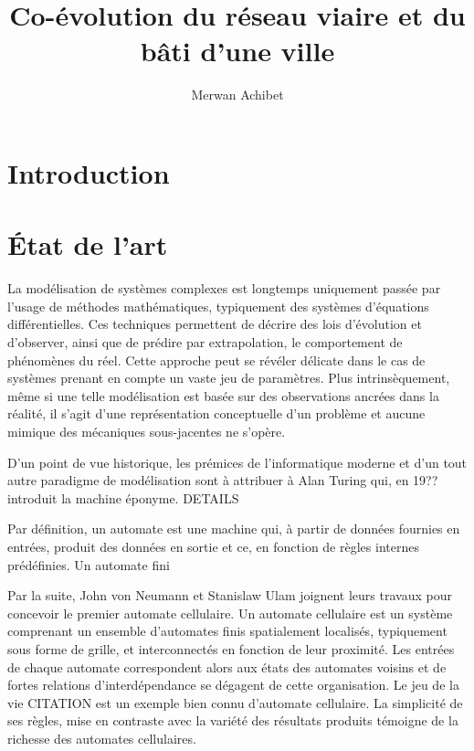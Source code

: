 \documentclass[10pt,twocolumn]{article}
\title{Co-évolution du réseau viaire et du bâti d'une ville}
\author{Merwan Achibet}
\date{}
\begin{document}
\maketitle

\begin{abstract}

\end{abstract}

\section{Introduction}

\section{\'Etat de l'art}

La modélisation de systèmes complexes est longtemps uniquement passée
par l'usage de méthodes mathématiques, typiquement des systèmes
d'équations différentielles. Ces techniques permettent de décrire des
lois d'évolution et d'observer, ainsi que de prédire par
extrapolation, le comportement de phénomènes du réel. Cette approche
peut se révéler délicate dans le cas de systèmes prenant en compte un
vaste jeu de paramètres. Plus intrinsèquement, même si une telle
modélisation est basée sur des observations ancrées dans la réalité,
il s'agit d'une représentation conceptuelle d'un problème et aucune
mimique des mécaniques sous-jacentes ne s'opère.

D'un point de vue historique, les prémices de l'informatique moderne
et d'un tout autre paradigme de modélisation sont à attribuer à Alan
Turing qui, en 19?? introduit la machine éponyme. DETAILS

Par définition, un automate est une machine qui, à partir de données
fournies en entrées, produit des données en sortie et ce, en fonction
de règles internes prédéfinies. Un automate fini

Par la suite, John von Neumann et Stanislaw Ulam joignent leurs
travaux pour concevoir le premier automate cellulaire. Un automate
cellulaire est un système comprenant un ensemble d'automates finis
spatialement localisés, typiquement sous forme de grille, et
interconnectés en fonction de leur proximité. Les entrées de chaque
automate correspondent alors aux états des automates voisins et de
fortes relations d'interdépendance se dégagent de cette
organisation. Le jeu de la vie CITATION est un exemple bien connu
d'automate cellulaire. La simplicité de ses règles, mise en contraste
avec la variété des résultats produits témoigne de la richesse des
automates cellulaires.
\end{document}
